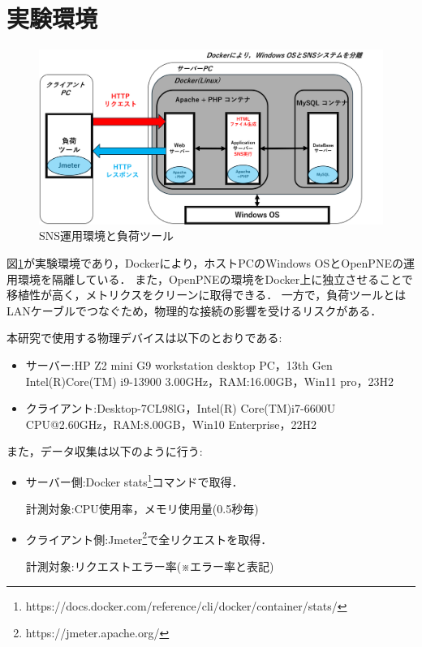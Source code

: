 \documentclass[twoside,twocolumn,10pt]{jarticle}  %
\begin{document}
\section{実験環境}
\label{sec:environment}
\begin{figure}
  \centering
  \includegraphics[scale=0.29]{figures/SNS_Docker.png}
  \vspace{0.05cm}
  \caption{SNS運用環境と負荷ツール}
  \label{fig:1}
\end{figure}
図\ref{fig:1}が実験環境であり，Dockerにより，ホストPCのWindows OSとOpenPNEの運用環境を隔離している．
また，OpenPNEの環境をDocker上に独立させることで移植性が高く，メトリクスをクリーンに取得できる．
一方で，負荷ツールとはLANケーブルでつなぐため，物理的な接続の影響を受けるリスクがある．

本研究で使用する物理デバイスは以下のとおりである:
\begin{itemize}
  \setlength{\parskip}{0cm} %
  \setlength{\itemsep}{0cm} %
  \item サーバー:HP Z2 mini G9 workstation desktop PC，13th Gen Intel(R)Core(TM) i9-13900 3.00GHz，RAM:16.00GB，Win11 pro，23H2
  \item クライアント:Desktop-7CL98lG，Intel(R) Core(TM)i7-6600U CPU@2.60GHz，RAM:8.00GB，Win10 Enterprise，22H2
\end{itemize}
また，データ収集は以下のように行う:
\begin{itemize}
  \setlength{\parskip}{0cm} %
  \setlength{\itemsep}{0cm} %
  \item サーバー側:Docker stats\footnote{https://docs.docker.com/reference/cli/docker/container/stats/}コマンドで取得．\par
  計測対象:CPU使用率，メモリ使用量(0.5秒毎)
  \item クライアント側:Jmeter\footnote{https://jmeter.apache.org/}で全リクエストを取得．\par
  計測対象:リクエストエラー率(※エラー率と表記)
\end{itemize}
\end{document}
